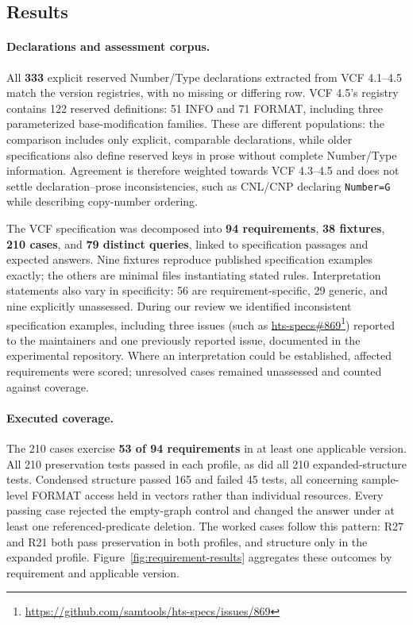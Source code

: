 \subsection{Results}
\label{sec:evidence}

\paragraph{Declarations and assessment corpus.}
All \textbf{333} explicit reserved Number/Type declarations extracted from VCF 4.1--4.5 match the version registries, with no missing or differing row.
VCF 4.5's registry contains 122 reserved definitions: 51 INFO and 71 FORMAT, including three parameterized base-modification families.
These are different populations: the comparison includes only explicit, comparable declarations, while older specifications also define reserved keys in prose without complete Number/Type information.
Agreement is therefore weighted towards VCF 4.3--4.5 and does not settle declaration--prose inconsistencies, such as CNL/CNP declaring \texttt{Number=G} while describing copy-number ordering.

The VCF specification was decomposed into \textbf{94 requirements}, \textbf{38 fixtures}, \textbf{210 cases}, and \textbf{79 distinct queries}, linked to specification passages and expected answers.
Nine fixtures reproduce published specification examples exactly; the others are minimal files instantiating stated rules.
Interpretation statements also vary in specificity: 56 are requirement-specific, 29 generic, and nine explicitly unassessed.
During our review we identified inconsistent specification examples, including three issues (such as \href{https://github.com/samtools/hts-specs/issues/869}{hts-specs\#869}\footnote{\url{https://github.com/samtools/hts-specs/issues/869}}) reported to the maintainers and one previously reported issue, documented in the experimental repository.
Where an interpretation could be established, affected requirements were scored; unresolved cases remained unassessed and counted against coverage.

\paragraph{Executed coverage.}
The 210 cases exercise \textbf{53 of 94 requirements} in at least one applicable version.
All 210 preservation tests passed in each profile, as did all 210 expanded-structure tests.
Condensed structure passed 165 and failed 45 tests, all concerning sample-level FORMAT access held in vectors rather than individual resources.
Every passing case rejected the empty-graph control and changed the answer under at least one referenced-predicate deletion.
The worked cases follow this pattern: R27 and R21 both pass preservation in both profiles, and structure only in the expanded profile.
Figure~\ref{fig:requirement-results} aggregates these outcomes by requirement and applicable version.

